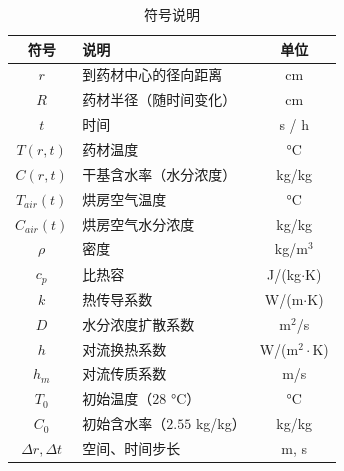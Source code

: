 \begin{table}[htbp]
	\caption{符号说明}
	\label{tab:symbols}
	\centering
	\begin{tabular}{clc}
		\toprule
		符号 & 说明 & 单位 \\
		\midrule
		$r$ & 到药材中心的径向距离 & cm \\
		$R$ & 药材半径（随时间变化） & cm \\
		$t$ & 时间 & s / h \\
		$T(r,t)$ & 药材温度 & °C \\
		$C(r,t)$ & 干基含水率（水分浓度） & kg/kg \\
		$T_{air}(t)$ & 烘房空气温度 & °C \\
		$C_{air}(t)$ & 烘房空气水分浓度 & kg/kg \\
		$\rho$ & 密度 & kg/m$^3$ \\
		$c_p$ & 比热容 & J/(kg$\cdot$K) \\
		$k$ & 热传导系数 & W/(m$\cdot$K) \\
		$D$ & 水分浓度扩散系数 & m$^2$/s \\
		$h$ & 对流换热系数 & W/(m$^2\cdot$K) \\
		$h_m$ & 对流传质系数 & m/s \\
		$T_0$ & 初始温度（$28$ °C） & °C \\
		$C_0$ & 初始含水率（$2.55$ kg/kg） & kg/kg \\
		$\Delta r,\Delta t$ & 空间、时间步长 & m, s \\
		\bottomrule
	\end{tabular}
\end{table}
